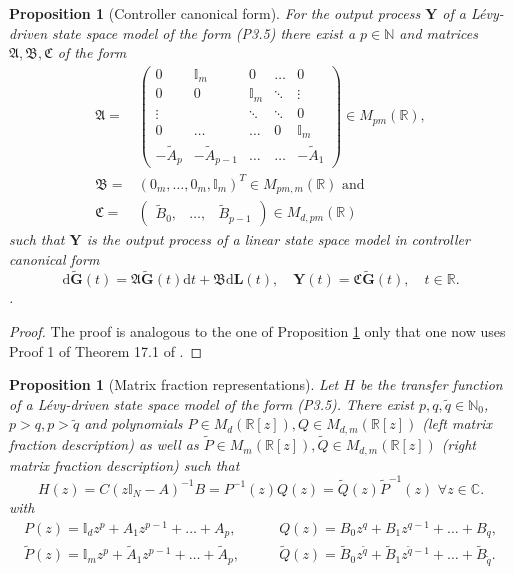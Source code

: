 \documentclass[preprint,a4paper,authoryear]{imsart}
\numberwithin{equation}{section}
\newcommand{\R}{\mathbb{R}}
\newcommand{\Y}{\boldsymbol{Y}}
\newcommand{\Lb}{\boldsymbol{L}}
\theoremstyle{plain}
\newtheorem{proposition}[theorem]{Proposition}
\theoremstyle{definition}
\theoremstyle{remark}
\begin{document}
\begin{proposition}[Controller canonical form]\label{prop:controller}
	For the output process $\mathbf{Y}$ of a L\'evy-driven state space model of the form (P3.5) there exist a $p\in\mathbb{N}$ and matrices $\mathfrak{A,B,C}$ of the form 
	\begin{align}
	 \mathfrak{A} =& \left(\begin{array}{ccccc}
			0 & \mathbb{I}_m & 0 & \ldots & 0 \\
			0 & 0 & \mathbb{I}_m & \ddots & \vdots \\
			\vdots && \ddots & \ddots & 0\\
			0 & \ldots & \ldots & 0 & \mathbb{I}_m\\
			-\widetilde A_p & -\widetilde A_{p-1} & \ldots & \ldots & -\widetilde A_1
		\end{array}\right)\in M_{pm}(\R),\\
	\mathfrak{B}=&\left(0_m,\ldots,0_m,\mathbb{I}_m\right)^T\in M_{pm,m}(\R)\text{ and}\\
	\mathfrak{C}=&\left(\begin{array}{ccc}\widetilde B_0, & \ldots, & \widetilde B_{p-1}\end{array}\right)\in M_{d,pm}(\mathbb{R})
	\end{align}
such that $\mathbf{Y}$  is the output process of  a linear state space model in controller canonical form 
	\begin{equation}
		\mathrm{d}\widetilde{\boldsymbol{G}}(t)=\mathfrak{A}\widetilde{\boldsymbol{G}}(t)\mathrm{d}t+\mathfrak{B}\mathrm{d}\Lb(t),\quad \Y(t)=\mathfrak{C}\widetilde{\boldsymbol{G}}(t),\quad t\in\R.
	\end{equation}
	.
\end{proposition}
\begin{proof}
The proof is analogous to the one of Proposition \ref{prop:controller} only that one now uses Proof 1 of Theorem 17.1 of \cite{Brockett2015}.
\end{proof}
\begin{proposition}[Matrix fraction representations]
	Let $H$ be the transfer function  of a L\'evy-driven  state space model of the form (P3.5). There exist $p,q,\tilde q\in\mathbb{N}_0$, $p>q, p>\tilde q$ and
	polynomials $P\in M_d(\mathbb{R}[z]),Q\in M_{d,m}(\mathbb{R}[z])$ (left matrix fraction description) as well as $\widetilde P \in M_m(\mathbb{R}[z]), \widetilde Q\in M_{d,m}(\mathbb{R}[z])$ (right matrix fraction description) such that
	\[
	H(z)=C(z\mathbb{I}_N-A)^{-1} B=P^{-1}(z)Q(z)=\widetilde Q(z) \widetilde P^{-1}(z)\,\,\forall z \in \mathbb{C}.
	\]
	with
	\begin{eqnarray*}
		P(z)=\mathbb{I}_dz^p+A_1z^{p-1}+\ldots+A_p, &\qquad
		Q(z)=B_0z^q+B_1 z^{q-1}+\ldots+B_q,\\
	\widetilde	P(z)=\mathbb{I}_mz^p+\widetilde A_1z^{p-1}+\ldots+\widetilde A_p,&\qquad
\widetilde	Q(z)=\widetilde B_0z^{\tilde q}+\widetilde B_1 z^{\tilde q-1}+\ldots+\widetilde B_{\tilde q}.
	\end{eqnarray*}
\end{proposition}
\end{document}
